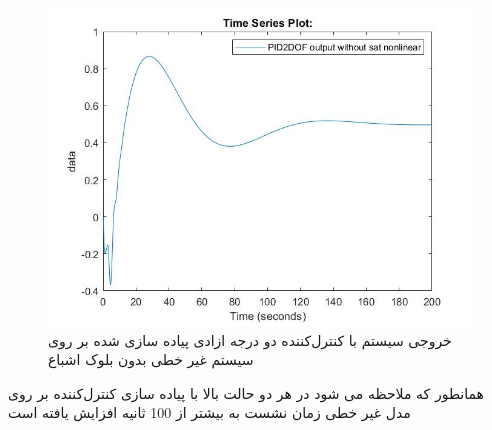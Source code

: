 \begin{figure}[H]
	\centering
	\includegraphics[width=12cm]{../Figure/P_V/PID2DOF output without sat nonlinear.jpg}
	\caption{خروجی سیستم با کنترل‌کننده دو درجه ازادی پیاده سازی شده بر روی سیستم غیر خطی بدون بلوک اشباع}
\end{figure}



همانطور که ملاحظه می شود در هر دو حالت بالا با پیاده سازی کنترل‌کننده بر روی مدل غیر خطی زمان نشست به بیشتر از 100 ثانیه افزایش یافته است